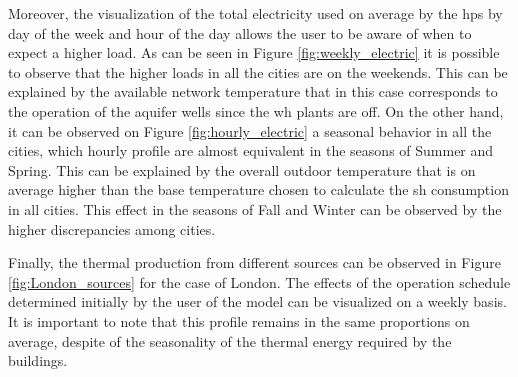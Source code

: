\documentclass{article}
\begin{document}
Moreover, the visualization of the total electricity used on average by the \gls{hp}s by day of the week and hour of the day allows the user to be aware of when to expect a higher load. As can be seen in Figure \ref{fig:weekly_electric} it is possible to observe that the higher loads in all the cities are on the weekends. This can be explained by the available network temperature that in this case corresponds to the operation of the aquifer wells since the \gls{wh} plants are off. On the other hand, it can be observed on Figure \ref{fig:hourly_electric} a seasonal behavior in all the cities, which hourly profile are almost equivalent in the seasons of Summer and Spring. This can be explained by the overall outdoor temperature that is on average higher than the base temperature chosen to calculate the \gls{sh} consumption in all cities. This effect in the seasons of Fall and Winter can be observed by the higher discrepancies among cities.

Finally, the thermal production from different sources can be observed in Figure \ref{fig:London_sources} for the case of London. The effects of the operation schedule determined initially by the user of the model can be visualized on a weekly basis. It is important to note that this profile remains in the same proportions on average, despite of the seasonality of the thermal energy required by the buildings.






\clearpage
\printbibliography
\end{document}
